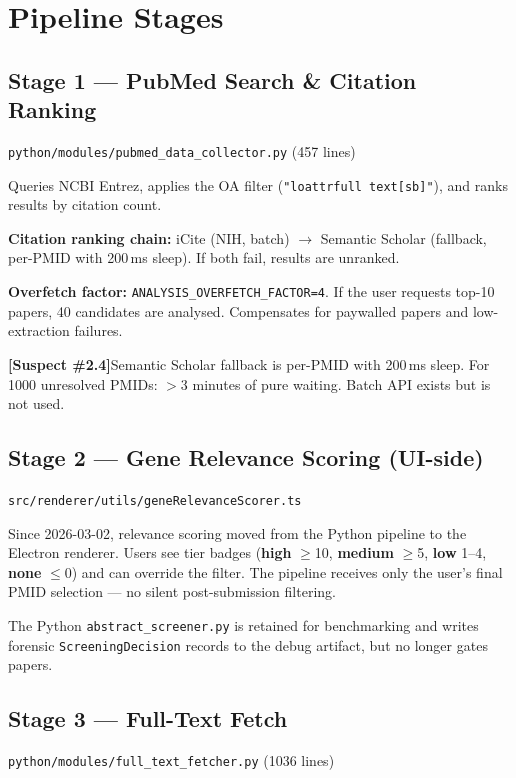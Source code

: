 \documentclass[11pt,a4paper]{article}
\newcommand{\warnbox}[2]{%
  \vspace{0.4em}
  \noindent\colorbox{LightRed}{\parbox{\dimexpr\linewidth-2\fboxsep}{%
    \small\color{DarkRed}\textbf{[#1]}\quad #2}}
  \vspace{0.4em}
}
\newcommand{\codefile}[1]{\texttt{\small\color{gray}#1}}
\begin{document}
\section{Pipeline Stages}

\subsection{Stage 1 --- PubMed Search \& Citation Ranking}
\codefile{python/modules/pubmed\_data\_collector.py} (457 lines)

Queries NCBI Entrez, applies the OA filter (\texttt{"loattrfull text[sb]"}), and ranks results by citation count.

\textbf{Citation ranking chain:} iCite (NIH, batch) $\to$ Semantic Scholar (fallback, per-PMID with 200\,ms sleep). If both fail, results are unranked.

\textbf{Overfetch factor:} \texttt{ANALYSIS\_OVERFETCH\_FACTOR=4}. If the user requests top-10 papers, 40 candidates are analysed. Compensates for paywalled papers and low-extraction failures.

\warnbox{Suspect \#2.4}{Semantic Scholar fallback is per-PMID with 200\,ms sleep. For 1000 unresolved PMIDs: $>$3 minutes of pure waiting. Batch API exists but is not used.}

\subsection{Stage 2 --- Gene Relevance Scoring (UI-side)}
\codefile{src/renderer/utils/geneRelevanceScorer.ts}

Since 2026-03-02, relevance scoring moved from the Python pipeline to the Electron renderer. Users see tier badges (\textbf{high} $\geq$10, \textbf{medium} $\geq$5, \textbf{low} 1--4, \textbf{none} $\leq$0) and can override the filter. The pipeline receives only the user's final PMID selection --- no silent post-submission filtering.

The Python \texttt{abstract\_screener.py} is retained for benchmarking and writes forensic \texttt{ScreeningDecision} records to the debug artifact, but no longer gates papers.

\subsection{Stage 3 --- Full-Text Fetch}
\codefile{python/modules/full\_text\_fetcher.py} (1036 lines)
\end{document}

